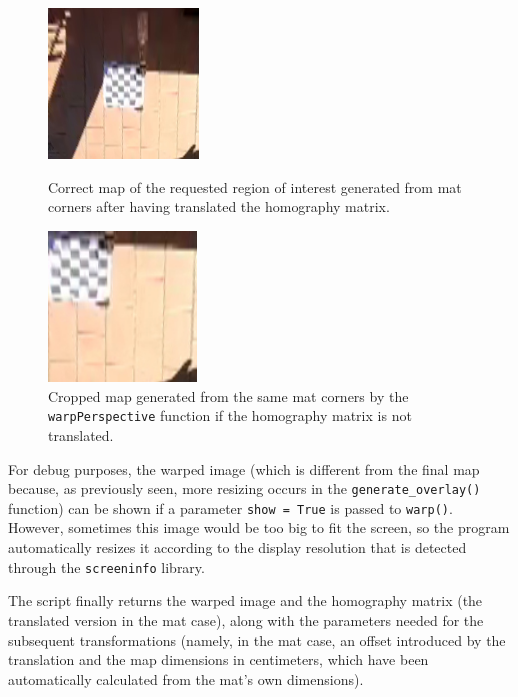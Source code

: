 \documentclass[12pt]{article}
\begin{document}
\begin{figure}[H]
  \centering
  \begin{minipage}[b]{0.45\textwidth}
    \centering
    \includegraphics[height=4cm,keepaspectratio]{img/chess_map.jpg}
    \caption{Correct map of the requested region of interest generated from mat corners after having translated the homography matrix.}
    \label{fig:chessmap}
  \end{minipage}
  \hfill
  \begin{minipage}[b]{0.45\textwidth}
    \centering
    \includegraphics[height=4cm,keepaspectratio]{img/chess_map_cropped.jpg}
    \caption{Cropped map generated from the same mat corners by the \lstinline{warpPerspective} function if the homography matrix is not translated.}
    \label{fig:chessmapcropped}
  \end{minipage}
\end{figure}

For debug purposes, the warped image (which is different from the final map because, as previously seen, more resizing occurs in the \lstinline{generate_overlay()} function) can be shown if a parameter \lstinline{show = True} is passed to \lstinline{warp()}. However, sometimes this image would be too big to fit the screen, so the program automatically resizes it according to the display resolution that is detected through the \lstinline{screeninfo} library\cite{screeninfo}.

The script finally returns the warped image and the homography matrix (the translated version in the mat case), along with the parameters needed for the subsequent transformations (namely, in the mat case, an offset introduced by the translation and the map dimensions in centimeters, which have been automatically calculated from the mat's own dimensions).
\end{document}
